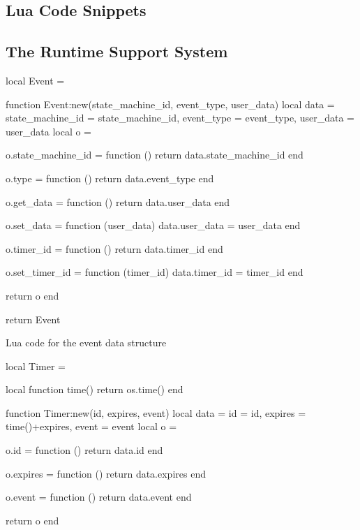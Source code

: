 \begin{appendices}

\chapter{Lua Code Snippets}
\label{app:code}

\section{The Runtime Support System}
\label{code:rts}

\begin{listing}[H]
\begin{luacode}
local Event = {}

function Event:new(state_machine_id, event_type, user_data)
	local data = {state_machine_id = state_machine_id, event_type = event_type,
	              user_data = user_data}
	local o = {}

	o.state_machine_id = function ()
		return data.state_machine_id
	end

	o.type = function ()
		return data.event_type
	end

	o.get_data = function ()
		return data.user_data
	end

	o.set_data = function (user_data)
		data.user_data = user_data
	end

	o.timer_id = function ()
		return data.timer_id
	end

	o.set_timer_id = function (timer_id)
		data.timer_id = timer_id
	end

	return o
end

return Event
\end{luacode}
	\caption{Lua code for the event data structure }
	\label{code:event}
\end{listing}

\begin{listing}[H]
\begin{luacode}
local Timer = {}

local function time()
	return os.time()
end

function Timer:new(id, expires, event)
	local data = {id = id, expires = time()+expires, event = event}
	local o = {}

	o.id = function ()
		return data.id
	end

	o.expires = function ()
		return data.expires
	end

	o.event = function ()
		return data.event
	end

	return o
end


\end{luacode}
\end{listing}
\end{appendices}
